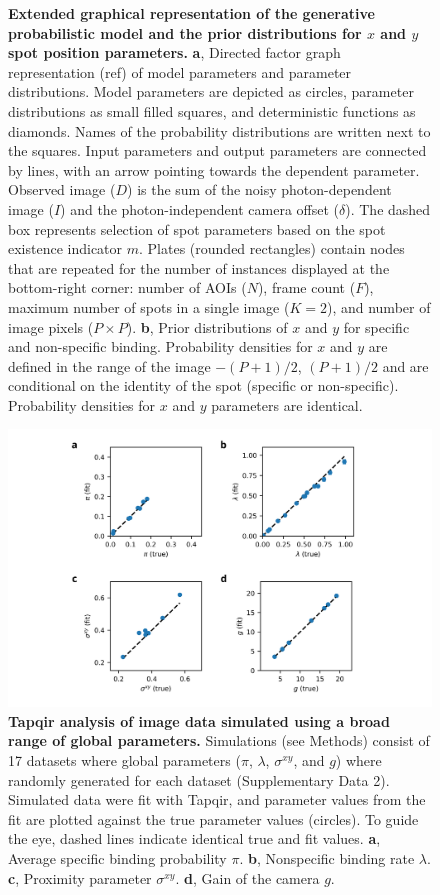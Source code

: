 \begin{figure} [t]
\caption{\textbf{Extended graphical representation of the generative probabilistic model and the prior distributions for $x$ and $y$ spot position parameters.} \textbf{a}, Directed factor graph representation (ref) of model parameters and parameter distributions. Model parameters are depicted as circles, parameter distributions as small filled squares, and deterministic functions as diamonds. Names of the probability distributions are written next to the squares. Input parameters and output parameters are connected by lines, with an arrow pointing towards the dependent parameter. Observed image ($D$) is the sum of the noisy photon-dependent image ($I$) and the photon-independent camera offset ($\delta$). The dashed box represents selection of spot parameters based on the spot existence indicator $m$. Plates (rounded rectangles) contain nodes that are repeated for the number of instances displayed at the bottom-right corner: number of AOIs ($N$), frame count ($F$), maximum number of spots in a single image ($K=2$), and number of image pixels ($P \times P$). \textbf{b}, Prior distributions of $x$ and $y$ for specific and non-specific binding. Probability densities for $x$ and $y$ are defined in the range of the image $-(P+1)/2$, $(P+1)/2$ and are conditional on the identity of the spot (specific or non-specific).  Probability densities for $x$ and $y$ parameters are identical. }
\end{figure}
\clearpage

\begin{figure}[h]
\centering
\includegraphics[width=150mm]{extended-data/figure2/figure2.png}
\caption{\textbf{Tapqir analysis of image data simulated using a broad range of global parameters.} Simulations (see Methods) consist of 17 datasets where global parameters ($\pi$, $\lambda$, $\sigma^{xy}$, and $g$) where randomly generated for each dataset (Supplementary Data 2). Simulated data were fit with Tapqir, and parameter values from the fit are plotted against the true parameter values (circles). To guide the eye, dashed lines  indicate identical true and fit values. \textbf{a}, Average specific binding probability $\pi$. \textbf{b}, Nonspecific binding rate $\lambda$. \textbf{c}, Proximity parameter $\sigma^{xy}$. \textbf{d}, Gain of the camera $g$. }
\label{fig:tapqir_global}
\end{figure}
\pagebreak


